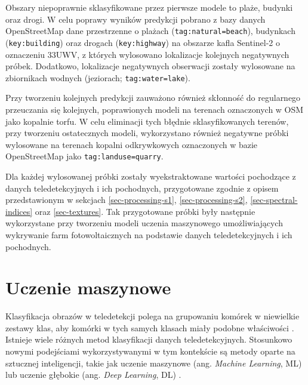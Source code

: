 \documentclass{amuthesis}
\begin{document}
Obszary niepoprawnie sklasyfikowane przez pierwsze modele to plaże,
budynki oraz drogi. W celu poprawy wyników predykcji pobrano z bazy
danych OpenStreetMap dane przestrzenne o plażach
(\texttt{tag:natural=beach}), budynkach (\texttt{key:building}) oraz
drogach (\texttt{key:highway}) na obszarze kafla Sentinel-2 o oznaczeniu
33UWV, z których wylosowano lokalizacje kolejnych negatywnych próbek.
Dodatkowo, lokalizacje negatywnych obserwacji zostały wylosowane na
zbiornikach wodnych (jeziorach; \texttt{tag:water=lake}).

Przy tworzeniu kolejnych predykcji zauważono również skłonność do
regularnego przeuczania się kolejnych, poprawionych modeli na terenach
oznaczonych w OSM jako kopalnie torfu. W celu eliminacji tych błędnie
sklasyfikowanych terenów, przy tworzeniu ostatecznych modeli,
wykorzystano również negatywne próbki wylosowane na terenach kopalni
odkrywkowych oznaczonych w bazie OpenStreetMap jako
\texttt{tag:landuse=quarry}.

Dla każdej wylosowanej próbki zostały wyekstraktowane wartości
pochodzące z danych teledetekcyjnych i ich pochodnych, przygotowane
zgodnie z opisem przedstawionym w sekcjach \ref{sec-processing-s1},
\ref{sec-processing-s2}, \ref{sec-spectral-indices} oraz
\ref{sec-textures}. Tak przygotowane próbki były następnie wykorzystane
przy tworzeniu modeli uczenia maszynowego umożliwiających wykrywanie
farm fotowoltaicznych na podstawie danych teledetekcyjnych i ich
pochodnych.

\hypertarget{sec-machine-learning}{%
\section{Uczenie maszynowe}\label{sec-machine-learning}}

Klasyfikacja obrazów w teledetekcji polega na grupowaniu komórek w
niewielkie zestawy klas, aby komórki w tych samych klasach miały podobne
właściwości \autocite{ismail_2009_classification}. Istnieje wiele
różnych metod klasyfikacji danych teledetekcyjnych. Stosunkowo nowymi
podejściami wykorzystywanymi w tym kontekście są metody oparte na
sztucznej inteligencji, takie jak uczenie maszynowe (ang. \emph{Machine
Learning}, ML) lub uczenie głębokie (ang. \emph{Deep Learning}, DL)
\autocite{hejmanowska_2020_dane}.
\end{document}
